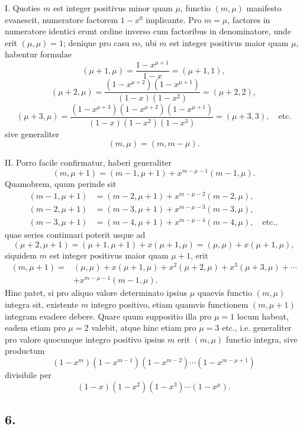 \documentclass[12pt]{article}
\begin{document}
I. Quoties $m$ est integer positivus minor quam $\mu$, functio $(m,\mu)$ manifesto evanescit, numeratore factorem $1-x^0$ implicante. Pro $m=\mu$, factores in numeratore identici erunt ordine inverso cum factoribus in denominatore, unde erit $(\mu,\mu)=1$; denique pro casu eo, ubi $m$ est integer positivus maior quam $\mu$, habentur formulae
\[
(\mu+1,\mu)=\frac{1-x^{\mu+1}}{1-x}=(\mu+1,1),
\]
\[
(\mu+2,\mu)=\frac{(1-x^{\mu+2})(1-x^{\mu+1})}{(1-x)(1-x^2)}=(\mu+2,2),
\]
\[
(\mu+3,\mu)=\frac{(1-x^{\mu+3})(1-x^{\mu+2})(1-x^{\mu+1})}{(1-x)(1-x^2)(1-x^3)}=(\mu+3,3),\quad\text{etc.}
\]
sive generaliter
\[
(m,\mu)=(m,m-\mu).
\]

II. Porro facile confirmatur, haberi generaliter
\[
(m,\mu+1)=(m-1,\mu+1)+x^{m-\mu-1}(m-1,\mu).
\]
Quamobrem, quum perinde sit
\[
\begin{aligned}
(m-1,\mu+1)&=(m-2,\mu+1)+x^{m-\mu-2}(m-2,\mu),\\
(m-2,\mu+1)&=(m-3,\mu+1)+x^{m-\mu-3}(m-3,\mu),\\
(m-3,\mu+1)&=(m-4,\mu+1)+x^{m-\mu-4}(m-4,\mu),\quad\text{etc.},
\end{aligned}
\]
quae series continuari poterit usque ad
\[
(\mu+2,\mu+1)=(\mu+1,\mu+1)+x(\mu+1,\mu)
=(\mu,\mu)+x(\mu+1,\mu),
\]
siquidem $m$ est integer positivus maior quam $\mu+1$, erit
\[
\begin{aligned}
(m,\mu+1)=&(\mu,\mu)+x(\mu+1,\mu)+x^2(\mu+2,\mu)+x^3(\mu+3,\mu)+\cdots\\
&+x^{m-\mu-1}(m-1,\mu).
\end{aligned}
\]
Hinc patet, si pro aliquo valore determinato ipsius $\mu$ quaevis functio $(m,\mu)$ integra sit, existente $m$ integro positivo, etiam quamvis functionem $(m,\mu+1)$ integram evadere debere. Quare quum suppositio illa pro $\mu=1$ locum habeat, eadem etiam pro $\mu=2$ valebit, atque hinc etiam pro $\mu=3$ etc., i.e. generaliter pro valore quocunque integro positivo ipsius $m$ erit $(m,\mu)$ functio integra, sive productum
\[
(1-x^m)(1-x^{m-1})(1-x^{m-2})\cdots(1-x^{m-\mu+1})
\]
divisibile per
\[
(1-x)(1-x^2)(1-x^3)\cdots(1-x^\mu).
\]

\subsection*{6.}
\end{document}
